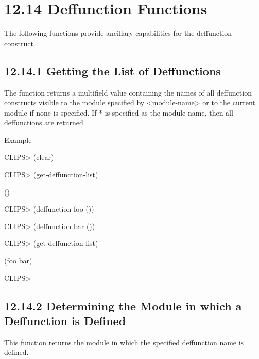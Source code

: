 \documentclass[letterpaper,10pt,english]{sphinxmanual}
\begin{document}
\begin{sphinxVerbatim}[commandchars=\\\{\}]
 
\end{sphinxVerbatim}


\section{12.14 Deffunction Functions}
\label{\detokenize{actions:deffunction-functions}}
The following functions provide ancillary capabilities for the
deffunction construct.


\subsection{12.14.1 Getting the List of Deffunctions}
\label{\detokenize{actions:getting-the-list-of-deffunctions}}
The function  returns a multifield value
containing the names of all deffunction constructs visible to the module
specified by \textless{}module-name\textgreater{} or to the current module if none is
specified. If * is specified as the module name, then all deffunctions
are returned.


\begin{sphinxVerbatim}[commandchars=\\\{\}]
 \PYG{p}{[}\PYG{p}{]}
\end{sphinxVerbatim}

Example

CLIPS\textgreater{} (clear)

CLIPS\textgreater{} (get-deffunction-list)

()

CLIPS\textgreater{} (deffunction foo ())

CLIPS\textgreater{} (deffunction bar ())

CLIPS\textgreater{} (get-deffunction-list)

(foo bar)

CLIPS\textgreater{}


\subsection{12.14.2 Determining the Module in which a Deffunction is Defined}
\label{\detokenize{actions:determining-the-module-in-which-a-deffunction-is-defined}}
This function returns the module in which the specified deffunction name
is defined.
\end{document}
